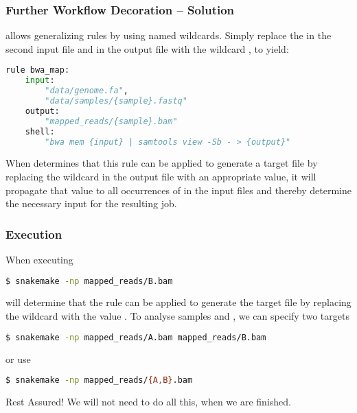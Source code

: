 \begin{frame}[fragile]
  \frametitle{Further Workflow Decoration -- Solution} 
  \footnotesize 
  \Snakemake{} allows generalizing rules by using named wildcards. Simply replace the  in the second input file and in the output file with the wildcard , to yield:
  \begin{lstlisting}[language=Python,style=Python,basicstyle=\footnotesize]
rule bwa_map:
    input:
        "data/genome.fa",
        "data/samples/{sample}.fastq"
    output:
        "mapped_reads/{sample}.bam"
    shell:
        "bwa mem {input} | samtools view -Sb - > {output}"
  \end{lstlisting}
  When \Snakemake{} determines that this rule can be applied to generate a target file by replacing the wildcard  in the output file with an appropriate value, it will propagate that value to all occurrences of  in the input files and thereby determine the necessary input for the resulting job. 
\end{frame}

\begin{frame}[fragile]
  \frametitle{Execution}
  When executing
  \begin{lstlisting}[language=Bash, style=Shell]
$ snakemake -np mapped_reads/B.bam
  \end{lstlisting}
  \Snakemake{} will determine that the rule  can be applied to generate the target file by replacing the wildcard  with the value .\newline
  To analyse samples  and , we can specify two targets
    \begin{lstlisting}[language=Bash, style=Shell]
$ snakemake -np mapped_reads/A.bam mapped_reads/B.bam
  \end{lstlisting}
  or use 
  \begin{lstlisting}[language=Bash, style=Shell]
$ snakemake -np mapped_reads/{A,B}.bam
  \end{lstlisting}
  \pause
  \begin{hint}{Rest Assured!}
  	We will not need to do all this, when we are finished.
  \end{hint}	
\end{frame}

